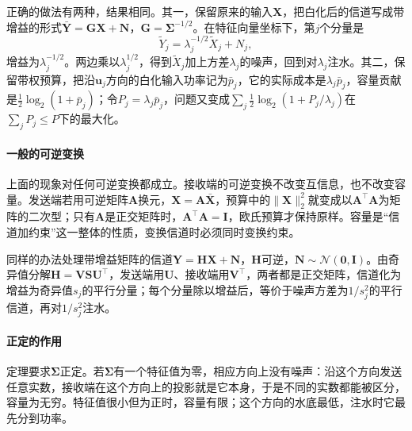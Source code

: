 正确的做法有两种，结果相同。其一，保留原来的输入$\bm{X}$，把白化后的信道写成带增益的形式$\bar{\bm{Y}}=\bm{G}\bm{X}+\bm{N}$，$\bm{G}=\bm{\Sigma}^{-1/2}$。在特征向量坐标下，第$j$个分量是
\[
 \tilde{Y}_j=\lambda_j^{-1/2}\tilde{X}_j+N_j ,
\]
增益为$\lambda_j^{-1/2}$。两边乘以$\lambda_j^{1/2}$，得到$\tilde{X}_j$加上方差$\lambda_j$的噪声，回到对$\lambda_j$注水。其二，保留带权预算，把沿$\bm{u}_j$方向的白化输入功率记为$\bar{p}_j$，它的实际成本是$\lambda_j\bar{p}_j$，容量贡献是$\frac12\log_2(1+\bar{p}_j)$；令$P_j=\lambda_j\bar{p}_j$，问题又变成$\sum_j\frac12\log_2(1+P_j/\lambda_j)$在$\sum_jP_j\leq P$下的最大化。

\paragraph{一般的可逆变换}
上面的现象对任何可逆变换都成立。接收端的可逆变换不改变互信息，也不改变容量。发送端若用可逆矩阵$\bm{A}$换元，$\bm{X}=\bm{A}\bar{\bm{X}}$，预算中的$\lVert\bm{X}\rVert_2^2$就变成以$\bm{A}^{\top}\bm{A}$为矩阵的二次型；只有$\bm{A}$是正交矩阵时，$\bm{A}^{\top}\bm{A}=\bm{I}$，欧氏预算才保持原样。容量是“信道加约束”这一整体的性质，变换信道时必须同时变换约束。

同样的办法处理带增益矩阵的信道$\bm{Y}=\bm{H}\bm{X}+\bm{N}$，$\bm{H}$可逆，$\bm{N}\sim\mathcal{N}(\bm{0},\bm{I})$。由奇异值分解$\bm{H}=\bm{V}\bm{S}\bm{U}^{\top}$，发送端用$\bm{U}$、接收端用$\bm{V}^{\top}$，两者都是正交矩阵，信道化为增益为奇异值$s_j$的平行分量；每个分量除以增益后，等价于噪声方差为$1/s_j^2$的平行信道，再对$1/s_j^2$注水。

\paragraph{正定的作用}
定理要求$\bm{\Sigma}$正定。若$\bm{\Sigma}$有一个特征值为零，相应方向上没有噪声：沿这个方向发送任意实数，接收端在这个方向上的投影就是它本身，于是不同的实数都能被区分，容量为无穷。特征值很小但为正时，容量有限；这个方向的水底最低，注水时它最先分到功率。
